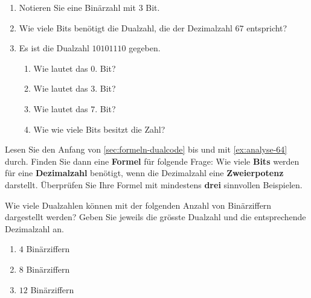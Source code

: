 \begin{exercise}
\begin{enumerate}
\item Notieren Sie eine Binärzahl mit $3$ Bit.
\fillwithlines{0.25in}
\item Wie viele Bits benötigt die Dualzahl, die der Dezimalzahl $67$ entspricht?
\fillwithlines{0.25in}
\item Es ist die Dualzahl $10101110$ gegeben.
\begin{multicols}{2}
\begin{enumerate}
\item Wie lautet das $0.$ Bit?
\fillwithlines{0.25in}
\item Wie lautet das $3.$ Bit?
\fillwithlines{0.25in}
\item Wie lautet das $7.$ Bit?
\fillwithlines{0.25in}
\item Wie wie viele Bits besitzt die Zahl?
\fillwithlines{0.25in}
\end{enumerate}
\end{multicols}
\end{enumerate}
\end{exercise}

\begin{exercise}
Lesen Sie den Anfang von \autoref{sec:formeln-dualcode} bis und mit \autoref{ex:analyse-64} durch. Finden Sie dann eine \textbf{Formel} für folgende Frage: Wie viele \textbf{Bits} werden für eine \textbf{Dezimalzahl} benötigt, wenn die Dezimalzahl eine \textbf{Zweierpotenz} darstellt. Überprüfen Sie Ihre Formel mit mindestens \textbf{drei} sinnvollen Beispielen.
\end{exercise}

\begin{exercise}
Wie viele Dualzahlen können mit der folgenden Anzahl von Binärziffern dargestellt werden? Geben Sie jeweils die grösste Dualzahl und die entsprechende Dezimalzahl an.

\begin{enumerate}
\item $4$ Binärziffern
\fillwithlines{0.25in}
\item $8$ Binärziffern
\fillwithlines{0.25in}
\item $12$ Binärziffern
\fillwithlines{0.25in}
\end{enumerate}
\end{exercise}

\vspace{-0.35cm}

